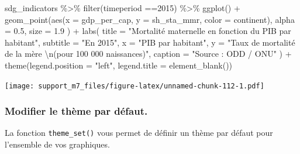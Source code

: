 \documentclass[
]{book}
\newenvironment{Shaded}{\begin{snugshade}}{\end{snugshade}}
\newcommand{\AttributeTok}[1]{\textcolor[rgb]{0.77,0.63,0.00}{#1}}
\newcommand{\DecValTok}[1]{\textcolor[rgb]{0.00,0.00,0.81}{#1}}
\newcommand{\FloatTok}[1]{\textcolor[rgb]{0.00,0.00,0.81}{#1}}
\newcommand{\FunctionTok}[1]{\textcolor[rgb]{0.00,0.00,0.00}{#1}}
\newcommand{\NormalTok}[1]{#1}
\newcommand{\SpecialCharTok}[1]{\textcolor[rgb]{0.00,0.00,0.00}{#1}}
\newcommand{\StringTok}[1]{\textcolor[rgb]{0.31,0.60,0.02}{#1}}
\begin{document}
\begin{Shaded}
\begin{Highlighting}[]
\NormalTok{sdg\_indicators }\SpecialCharTok{\%\textgreater{}\%} 
  \FunctionTok{filter}\NormalTok{(timeperiod }\SpecialCharTok{==}\DecValTok{2015}\NormalTok{) }\SpecialCharTok{\%\textgreater{}\%} 
  \FunctionTok{ggplot}\NormalTok{() }\SpecialCharTok{+}
  \FunctionTok{geom\_point}\NormalTok{(}\FunctionTok{aes}\NormalTok{(}\AttributeTok{x =}\NormalTok{ gdp\_per\_cap, }
                 \AttributeTok{y =}\NormalTok{ sh\_sta\_mmr,}
                 \AttributeTok{color =}\NormalTok{ continent),}
    \AttributeTok{alpha =} \FloatTok{0.5}\NormalTok{, }
    \AttributeTok{size =} \FloatTok{1.9}
\NormalTok{  ) }\SpecialCharTok{+}
  \FunctionTok{labs}\NormalTok{(}
    \AttributeTok{title =} \StringTok{"Mortalité maternelle en fonction du PIB par habitant"}\NormalTok{,}
    \AttributeTok{subtitle =} \StringTok{"En 2015"}\NormalTok{,}
    \AttributeTok{x =} \StringTok{"PIB par habitant"}\NormalTok{,}
    \AttributeTok{y =} \StringTok{"Taux de mortalité de la mère }\SpecialCharTok{\textbackslash{}n}\StringTok{(pour 100 000 naissances)"}\NormalTok{,}
    \AttributeTok{caption =} \StringTok{"Source : ODD / ONU"}
\NormalTok{  ) }\SpecialCharTok{+}
  \FunctionTok{theme}\NormalTok{(}\AttributeTok{legend.position =} \StringTok{"left"}\NormalTok{, }\AttributeTok{legend.title =} \FunctionTok{element\_blank}\NormalTok{())}
\end{Highlighting}
\end{Shaded}

\texttt{[image: support\_m7\_files/figure-latex/unnamed-chunk-112-1.pdf]}

\hypertarget{modifier-le-thuxe8me-par-duxe9faut.}{%
\subsubsection{Modifier le thème par défaut.}\label{modifier-le-thuxe8me-par-duxe9faut.}}

La fonction \texttt{theme\_set()} vous permet de définir un thème par défaut pour l'ensemble de vos graphiques.
\end{document}
